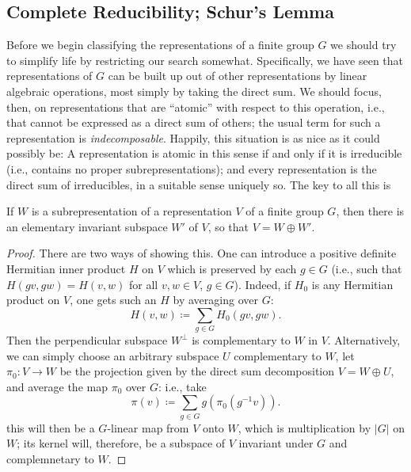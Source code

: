 \subsection{Complete Reducibility; Schur's Lemma}
Before we begin classifying the representations of a finite group $G$ we
should try to simplify life by restricting our search
somewhat. Specifically, we have seen that representations of $G$ can be
built up out of other representations by linear algebraic operations, most
simply by taking the direct sum. We should focus, then, on representations
that are ``atomic'' with respect to this operation, i.e., that cannot be
expressed as a direct sum of others; the usual term for such a
representation is \emph{indecomposable}. Happily, this situation is as nice
as it could possibly be: A representation is atomic in this sense if and
only if it is irreducible (i.e., contains no proper subrepresentations);
and every representation is the direct sum of irreducibles, in a suitable
sense uniquely so. The key to all this is
\begin{proposition}
If $W$ is a subrepresentation of a representation $V$ of a finite group
$G$, then there is an elementary invariant subspace $W'$ of $V$, so that
$V=W\oplus W'$.
\end{proposition}
\begin{proof}
  There are two ways of showing this. One can introduce a positive definite
  Hermitian inner product $H$ on $V$ which is preserved by each $g\in G$
  (i.e., such that $H(gv,gw)=H(v,w)$ for all $v,w\in V$,
  $g\in G$). Indeed, if $H_0$ is any Hermitian product on $V$, one gets
  such an $H$ by averaging over $G$:
  \begin{equation}
    \label{eq:1:hermitian-inn-prod}
    H(v,w)\coloneq\sum_{g\in G}H_0(gv,gw).
  \end{equation}
  Then the perpendicular subspace $W^\perp$ is complementary to $W$ in
  $V$. Alternatively, we can simply choose an arbitrary subspace $U$
  complementary to $W$, let $\pi_0\colon V\to W$ be the projection given by
  the direct sum decomposition $V=W\oplus U$, and average the map $\pi_0$
  over $G$: i.e., take
  \begin{equation}
    \label{eq:1:averaging-map}
    \pi(v)\coloneq\sum_{g\in G}g(\pi_0(g^{-1}v)).
  \end{equation}
  this will then be a $G$-linear map from $V$ onto $W$, which is
  multiplication by $|G|$ on $W$; its kernel will, therefore, be a subspace
  of $V$ invariant under $G$ and complemnetary to $W$.
\end{proof}

